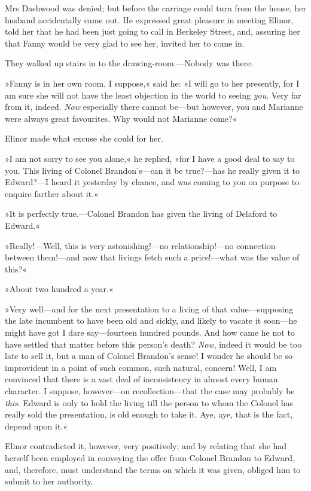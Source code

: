 Mrs Dashwood was denied; but before the carriage could turn from the house, her husband accidentally came out. He expressed great pleasure in meeting Elinor, told her that he had been just going to call in Berkeley Street, and, assuring her that Fanny would be very glad to see her, invited her to come in.

They walked up stairs in to the drawing-room.—Nobody was there.

»Fanny is in her own room, I suppose,« said he: »I will go to her presently, for I am sure she will not have the least objection in the world to seeing \textit{you}. Very far from it, indeed. \textit{Now} especially there cannot be—but however, you and Marianne were always great favourites. Why would not Marianne come?«

Elinor made what excuse she could for her.

»I am not sorry to see you alone,« he replied, »for I have a good deal to say to you. This living of Colonel Brandon’s—can it be true?—has he really given it to Edward?—I heard it yesterday by chance, and was coming to you on purpose to enquire farther about it.«

»It is perfectly true.—Colonel Brandon has given the living of Delaford to Edward.«

»Really!—Well, this is very astonishing!—no relationship!—no connection between them!—and now that livings fetch such a price!—what was the value of this?«

»About two hundred a year.«

»Very well—and for the next presentation to a living of that value—supposing the late incumbent to have been old and sickly, and likely to vacate it soon—he might have got I dare say—fourteen hundred pounds. And how came he not to have settled that matter before this person’s death? \textit{Now}, indeed it would be too late to sell it, but a man of Colonel Brandon’s sense! I wonder he should be so improvident in a point of such common, such natural, concern! Well, I am convinced that there is a vast deal of inconsistency in almost every human character. I suppose, however—on recollection—that the case may probably be \textit{this}. Edward is only to hold the living till the person to whom the Colonel has really sold the presentation, is old enough to take it. Aye, aye, that is the fact, depend upon it.«

Elinor contradicted it, however, very positively; and by relating that she had herself been employed in conveying the offer from Colonel Brandon to Edward, and, therefore, must understand the terms on which it was given, obliged him to submit to her authority.

